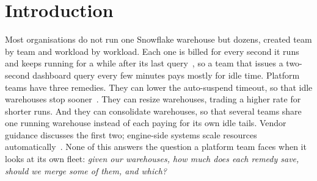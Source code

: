\documentclass[conference]{IEEEtran}
\begin{document}
\section{Introduction}
Most organisations do not run one Snowflake warehouse but dozens, created team by team and workload by workload. Each one
is billed for every second it runs and keeps running for a while after its last query~\cite{sf-warehouses,sf-create}, so
a team that issues a two-second dashboard query every few minutes pays mostly for idle time. Platform teams have three
remedies. They can lower the auto-suspend timeout, so that idle warehouses stop sooner~\cite{sf-considerations}. They can
resize warehouses, trading a higher rate for shorter runs. And they can consolidate warehouses, so that several teams share
one running warehouse instead of each paying for its own idle tails. Vendor guidance discusses the first two; engine-side
systems scale resources automatically~\cite{rais24,scalesense26,costintel24}. None of this answers the question a platform
team faces when it looks at its own fleet: \emph{given our warehouses, how much does each remedy save, should we merge some
of them, and which?}
\end{document}
